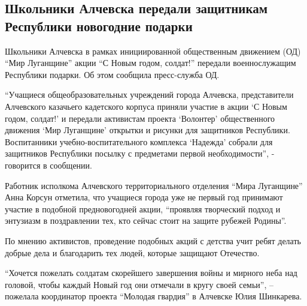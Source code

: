  
 
 
 
 
\subsection{Школьники Алчевска передали защитникам Республики новогодние подарки}
\label{sec:17_12_2021.stz.news.lnr.lug_info.1.podarki_zaschitniki_novyj_god}


Школьники Алчевска в рамках инициированной общественным движением (ОД) \enquote{Мир
Луганщине} акции \enquote{С Новым годом, солдат!} передали военнослужащим Республики
подарки. Об этом сообщила пресс-служба ОД.

\enquote{Учащиеся общеобразовательных учреждений города Алчевска, представители
Алчевского казачьего кадетского корпуса приняли участие в акции \enquote{С Новым годом,
солдат!} и передали активистам проекта \enquote{Волонтер} общественного движения \enquote{Мир
Луганщине} открытки и рисунки для защитников Республики. Воспитанники
учебно-воспитательного комплекса \enquote{Надежда} собрали для защитников Республики
посылку с предметами первой необходимости}, - говорится в сообщении.

Работник исполкома Алчевского территориального отделения \enquote{Мира Луганщине} Анна
Корсун отметила, что учащиеся города уже не первый год принимают участие в
подобной предновогодней акции, \enquote{проявляя творческий подход и энтузиазм в
поздравлении тех, кто сейчас стоит на защите рубежей Родины}.


По мнению активистов, проведение подобных акций с детства учит ребят делать
добрые дела и благодарить тех людей, которые защищают Отечество.

\enquote{Хочется пожелать солдатам скорейшего завершения войны и мирного неба над
головой, чтобы каждый Новый год они отмечали в кругу своей семьи}, – пожелала
координатор проекта \enquote{Молодая гвардия} в Алчевске Юлия Шинкарева.

